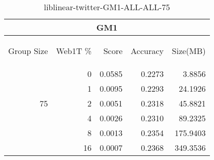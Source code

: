 \begin{center}
\begin{table}[htbp] 
 \begin{center}
\begin{tabular}{ | r | r | r | r | r |}
\hline
\multicolumn{5}{|c|}{GM1}\\
\hline
\begin{sideways}Group Size\end{sideways} & \begin{sideways}Web1T \%\end{sideways} & \begin{sideways}Score\end{sideways} & \begin{sideways}Accuracy\end{sideways} & \begin{sideways}Size(MB)\end{sideways}\\
\hline
\multirow{5}{*}{75}
 & 0 & 0.0585 & 0.2273 & 3.8856\\ \cline{2-5}
 & 1 & 0.0095 & 0.2293 & 24.1926\\ \cline{2-5}
 & 2 & 0.0051 & 0.2318 & 45.8821\\ \cline{2-5}
 & 4 & 0.0026 & 0.2310 & 89.2325\\ \cline{2-5}
 & 8 & 0.0013 & 0.2354 & 175.9403\\ \cline{2-5}
 & 16 & 0.0007 & 0.2368 & 349.3536\\ \cline{2-5}
\hline
\end{tabular}
\caption{liblinear-twitter-GM1-ALL-ALL-75}
\label{table:liblinear-twitter-GM1-ALL-ALL-75}
\end{center}
 \end{table}
\end{center}

